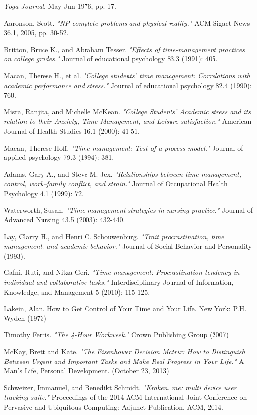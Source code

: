 \documentclass[conference]{IEEEtran}
\begin{document}
\begin{thebibliography}{1}

\emph{Yoga Journal}, \relax May-Jun 1976, pp. 17.

Aaronson, Scott. \emph{"NP-complete problems and physical reality."} ACM Sigact News 36.1, 2005, pp. 30-52.

Britton, Bruce K., and Abraham Tesser. \emph{"Effects of time-management practices on college grades."} Journal of educational psychology 83.3 (1991): 405.

Macan, Therese H., et al. \emph{"College students' time management: Correlations with academic performance and stress."} Journal of educational psychology 82.4 (1990): 760.

Misra, Ranjita, and Michelle McKean. \emph{"College Students' Academic stress and its relation to their Anxiety, Time Management, and Leisure satisfaction."} American Journal of Health Studies 16.1 (2000): 41-51.

Macan, Therese Hoff. \emph{"Time management: Test of a process model."} Journal of applied psychology 79.3 (1994): 381.

Adams, Gary A., and Steve M. Jex. \emph{"Relationships between time management, control, work–family conflict, and strain."} Journal of Occupational Health Psychology 4.1 (1999): 72.

Waterworth, Susan. \emph{"Time management strategies in nursing practice."} Journal of Advanced Nursing 43.5 (2003): 432-440.

Lay, Clarry H., and Henri C. Schouwenburg. \emph{"Trait procrastination, time management, and academic behavior."} Journal of Social Behavior and Personality (1993).

Gafni, Ruti, and Nitza Geri. \emph{"Time management: Procrastination tendency in individual and collaborative tasks."} Interdisciplinary Journal of Information, Knowledge, and Management 5 (2010): 115-125.

Lakein, Alan. How to Get Control of Your Time and Your Life. New York: P.H. Wyden (1973)

Timothy Ferris. \emph{"The 4-Hour Workweek."} Crown Publishing Group (2007)

McKay, Brett and Kate. \emph{"The Eisenhower Decision Matrix: How to Distinguish Between Urgent and Important Tasks and Make Real Progress in Your Life."} A Man's Life, Personal Development. (October 23, 2013)

Schweizer, Immanuel, and Benedikt Schmidt. \emph{"Kraken. me: multi device	 user tracking suite."} Proceedings of the 2014 ACM International	Joint Conference on Pervasive	and	Ubiquitous Computing: Adjunct Publication. ACM, 2014.


\end{thebibliography}




\end{document}
